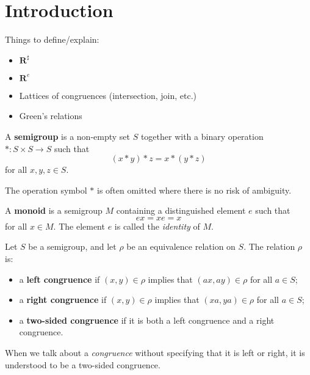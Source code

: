 \chapter{Introduction}
\label{chap:intro}

Things to define/explain:

\begin{itemize}
\item $\mathbf{R}^\sharp$
\item $\mathbf{R}^e$
\item Lattices of congruences (intersection, join, etc.)
\item Green's relations
\end{itemize}

\begin{definition}
  \label{def:semigroup}
  A \textbf{semigroup} is a non-empty set $S$ together with
  a binary operation $*: S \times S \to S$ such that
  $$(x * y) * z = x * (y * z)$$
  for all $x, y, z \in S$.
\end{definition}
The operation symbol $*$ is often omitted where there is no risk of ambiguity.

\begin{definition}
  \label{def:monoid}
  A \textbf{monoid} is a semigroup $M$ containing a distinguished element $e$
  such that
  $$ex = xe = x$$
  for all $x \in M$.  The element $e$ is called the \textit{identity} of $M$.
\end{definition}

\begin{definition}
  \label{def:congruence}
  Let $S$ be a semigroup, and let $\rho$ be an equivalence relation on $S$.  The
  relation $\rho$ is:
  \begin{itemize}
  \item a \textbf{left congruence} if $(x, y) \in \rho$ implies that
    $(ax, ay) \in \rho$ for all $a \in S$;
  \item a \textbf{right congruence} if $(x, y) \in \rho$ implies that
    $(xa, ya) \in \rho$ for all $a \in S$;
  \item a \textbf{two-sided congruence} if it is both a left congruence and a
    right congruence.
  \end{itemize}
\end{definition}

When we talk about a \textit{congruence} without specifying that it is left or
right, it is understood to be a two-sided congruence.

